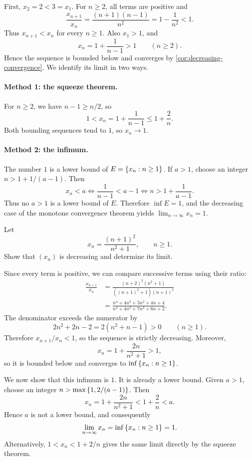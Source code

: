 \documentclass[11pt,a4paper]{amsart}
\begin{document}
\begin{solution}
  First, \(x_2=2<3=x_1\). For \(n\geq2\), all terms are positive and
  \[
    \frac{x_{n+1}}{x_n}
    =\frac{(n+1)(n-1)}{n^2}
    =1-\frac{1}{n^2}<1.
  \]
  Thus \(x_{n+1}<x_n\) for every \(n\geq1\). Also \(x_1>1\), and
  \[
    x_n=1+\frac{1}{n-1}>1\qquad(n\geq2).
  \]
  Hence the sequence is bounded below and converges by
  \cref{cor:decreasing-convergence}. We identify its limit in two ways.

  \paragraph{Method 1: the squeeze theorem.}
  For \(n\geq2\), we have \(n-1\geq n/2\), so
  \[
    1<x_n=1+\frac{1}{n-1}\leq1+\frac{2}{n}.
  \]
  Both bounding sequences tend to \(1\), so \(x_n\to1\).

  \paragraph{Method 2: the infimum.}
  The number \(1\) is a lower bound of \(E=\left\lbrace x_n:n\geq1\right\rbrace\).
  If \(a>1\), choose an integer \(n>1+1/(a-1)\). Then
  \[
    x_n<a
    \iff \frac{1}{n-1}<a-1
    \iff n>1+\frac{1}{a-1}.
  \]
  Thus no \(a>1\) is a lower bound of \(E\). Therefore \(\inf E=1\),
  and the decreasing case of the monotone convergence theorem yields
  \(\lim_{n\to\infty}x_n=1\).
\end{solution}

\begin{example}
  Let
  \[
    x_n=\frac{(n+1)^2}{n^2+1},\qquad n\geq1.
  \]
  Show that \((x_n)\) is decreasing and determine its limit.
\end{example}

\begin{solution}
  Since every term is positive, we can compare successive terms using
  their ratio:
  \begin{align*}
    \frac{x_{n+1}}{x_n}
    &=\frac{(n+2)^2(n^2+1)}{((n+1)^2+1)(n+1)^2}\\
    &=\frac{n^4+4n^3+5n^2+4n+4}
    {n^4+4n^3+7n^2+6n+2}.
  \end{align*}
  The denominator exceeds the numerator by
  \[
    2n^2+2n-2=2(n^2+n-1)>0\qquad(n\geq1).
  \]
  Therefore \(x_{n+1}/x_n<1\), so the sequence is strictly decreasing.
  Moreover,
  \[
    x_n=1+\frac{2n}{n^2+1}>1,
  \]
  so it is bounded below and converges to
  \(\inf\left\lbrace x_n:n\geq1\right\rbrace\).

  We now show that this infimum is \(1\). It is already a lower bound.
  Given \(a>1\), choose an integer \(n>\max\left\lbrace1,2/(a-1)\right\rbrace\). Then
  \[
    x_n=1+\frac{2n}{n^2+1}<1+\frac{2}{n}<a.
  \]
  Hence \(a\) is not a lower bound, and consequently
  \[
    \lim_{n\to\infty}x_n=\inf\left\lbrace x_n:n\geq1\right\rbrace=1.
  \]
  Alternatively, \(1<x_n<1+2/n\) gives the same limit directly by the
  squeeze theorem.
\end{solution}
\end{document}
